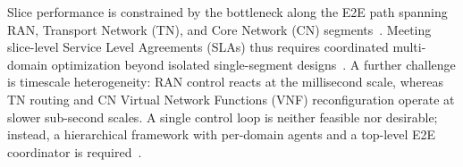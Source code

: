 \documentclass[12pt,lettersize,journal,onecolumn]{IEEEtran}
\begin{document}
Slice performance is constrained by the bottleneck along the E2E path spanning RAN, Transport Network (TN), and Core Network (CN) segments~\cite{comst24ebrahimi}. Meeting slice-level Service Level Agreements (SLAs) thus requires coordinated multi-domain optimization beyond isolated single-segment designs~\cite{jiot24filali,mnet23liu}. %
A further challenge is timescale heterogeneity: RAN control reacts at the millisecond scale, whereas TN routing and CN Virtual Network Functions (VNF) reconfiguration operate at slower sub-second scales. A single control loop is neither feasible nor desirable; instead, a hierarchical framework with per-domain agents and a top-level E2E coordinator is required~\cite{mnet23liu}. %
\end{document}
